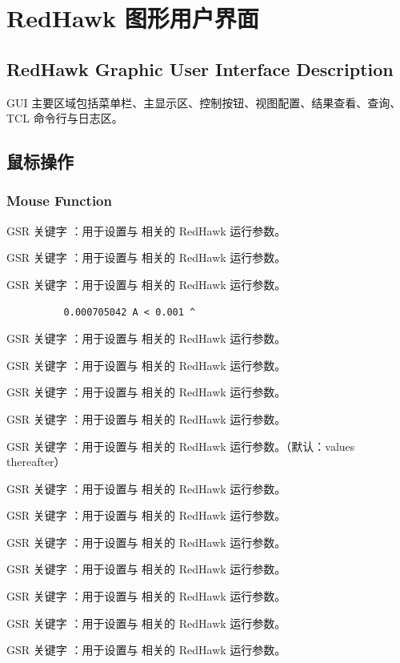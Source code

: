 \section{RedHawk 图形用户界面}
\subsection*{RedHawk Graphic User Interface Description}


GUI 主要区域包括菜单栏、主显示区、控制按钮、视图配置、结果查看、查询、TCL 命令行与日志区。

\subsection{鼠标操作}
\subsubsection*{Mouse Function}

GSR 关键字 ：用于设置与  相关的 RedHawk 运行参数。

GSR 关键字 ：用于设置与  相关的 RedHawk 运行参数。

GSR 关键字 ：用于设置与  相关的 RedHawk 运行参数。

\begin{lstlisting}
          0.000705042 A < 0.001 ^
\end{lstlisting}

GSR 关键字 ：用于设置与  相关的 RedHawk 运行参数。

GSR 关键字 ：用于设置与  相关的 RedHawk 运行参数。

GSR 关键字 ：用于设置与  相关的 RedHawk 运行参数。

GSR 关键字 ：用于设置与  相关的 RedHawk 运行参数。

GSR 关键字 ：用于设置与  相关的 RedHawk 运行参数。（默认：values thereafter）

GSR 关键字 ：用于设置与  相关的 RedHawk 运行参数。

GSR 关键字 ：用于设置与  相关的 RedHawk 运行参数。

GSR 关键字 ：用于设置与  相关的 RedHawk 运行参数。

GSR 关键字 ：用于设置与  相关的 RedHawk 运行参数。

GSR 关键字 ：用于设置与  相关的 RedHawk 运行参数。

GSR 关键字 ：用于设置与  相关的 RedHawk 运行参数。

GSR 关键字 ：用于设置与  相关的 RedHawk 运行参数。

